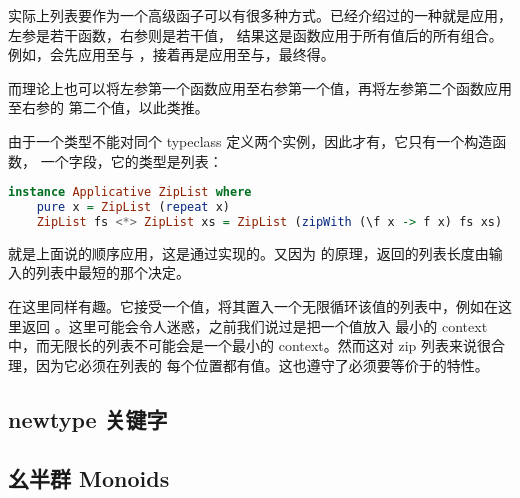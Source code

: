 \documentclass[./main.tex]{subfiles}
\begin{document}
实际上列表要作为一个高级函子可以有很多种方式。已经介绍过的一种就是应用\acode{<*>}，左参是若干函数，右参则是若干值，
结果这是函数应用于所有值后的所有组合。例如\acode{[(+3),(*2)] <*> [1,2]}，会先应用至与
，接着再是应用至与，最终得\acode{[4,5,2,4]}。

而\acode{[(+3),(*2)] <*> [1,2]}理论上也可以将左参第一个函数应用至右参第一个值，再将左参第二个函数应用至右参的
第二个值，以此类推。

由于一个类型不能对同个 typeclass 定义两个实例，因此才有，它只有一个构造函数，
一个字段，它的类型是列表：

\begin{lstlisting}[language=Haskell]
  instance Applicative ZipList where
    pure x = ZipList (repeat x)
    ZipList fs <*> ZipList xs = ZipList (zipWith (\f x -> f x) fs xs)
\end{lstlisting}

\acode{<*>}就是上面说的顺序应用，这是通过实现的。又因为
的原理，返回的列表长度由输入的列表中最短的那个决定。

在这里同样有趣。它接受一个值，将其置入一个无限循环该值的列表中，例如在这里返回
\acode{ZipList (["haha", "haha", "haha" ...)}。这里可能会令人迷惑，之前我们说过是把一个值放入
最小的 context 中，而无限长的列表不可能会是一个最小的 context。然而这对 zip 列表来说很合理，因为它必须在列表的
每个位置都有值。这也遵守了必须要等价于的特性。


\subsection*{newtype 关键字}


\subsection*{幺半群 Monoids}

\end{document}
